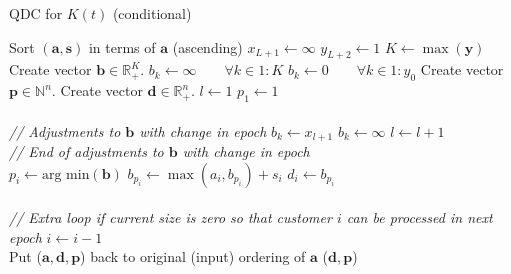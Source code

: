 \documentclass[article]{jss}
\begin{document}
\begin{algorithm}[!ht]
\caption{QDC for $K(t)$ (conditional)}
\label{alg:changing_servers}
\footnotesize
\begin{algorithmic}[1]
\State Sort $(\mathbf{a}, \mathbf{s})$ in terms of $\mathbf{a}$ (ascending)
\State $x_{L+1} \leftarrow \infty$
\State $y_{L+2} \leftarrow 1$
\State $K \leftarrow \max(\mathbf{y})$
\State Create vector $\mathbf{b} \in \mathbb{R}_{\text{+}}^{K}$. 
\State $b_k \leftarrow \infty \quad \quad \forall k \in 1:K $
\State $b_k \leftarrow 0 \quad \quad \forall k \in 1:y_0 $
\State Create vector $\mathbf{p} \in \mathbb{N}^{n}$.
\State Create vector $\mathbf{d} \in \mathbb{R}_{+}^{n}$.
\State $l \leftarrow 1$
\State $p_1 \leftarrow 1$ 
 \\ \\

\hspace{10mm} \textit{// Adjustments to $\mathbf{b}$ with change in epoch}
      	\State $b_k \leftarrow x_{l+1}$ 
      \EndFor
    \EndIf
        \State $b_k \leftarrow \infty$ 
      \EndFor
    \EndIf
    \State $l \leftarrow l + 1$
  \EndIf \\ 
 \hspace{10mm} \textit{// End of adjustments to $\mathbf{b}$ with change in epoch} \\
  \State $p_i \leftarrow \text{arg min}(\mathbf{b}) $
  \State $b_{p_i} \leftarrow \max(a_i, b_{p_i}) + s_i $
  \State $d_i \leftarrow b_{p_i}$ \\ \\
\hspace{10mm} \textit{// Extra loop if current size is zero so that customer $i$ can be processed in next epoch}
  	\State $i \leftarrow i - 1$
  \EndIf \\
\EndFor 
\State Put ($\mathbf{a}, \mathbf{d}, \mathbf{p}$) back to original (input) ordering of $\mathbf{a}$ 
\State \Return ($\mathbf{d}, \mathbf{p}$)
\EndFunction
\end{algorithmic}
\end{algorithm}
\end{document}
